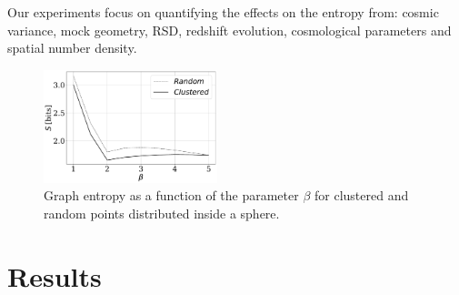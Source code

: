 \documentclass[fleqn,usenatbib]{mnras}
\begin{document}
Our experiments focus on quantifying the effects on the entropy from:
cosmic variance, mock geometry, RSD, redshift evolution, cosmological
parameters and spatial number density. 


\begin{figure}
    \includegraphics[width=0.45\textwidth]{entropy.pdf}
    \caption{Graph entropy as a function of the parameter $\beta$ 
    for clustered and random points distributed inside a sphere. \label{fig:entropy}}
\end{figure}




\section{Results}
\label{sec:results}
\end{document}
